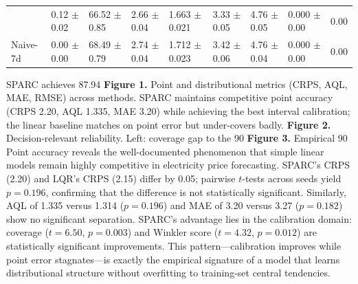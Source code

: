 {\begin{table}[t]
{\begin{tabular}{lllllllll}
{Naive-24h & 0.12 $\pm$ 0.02 & 66.52 $\pm$ 0.85 & 2.66 $\pm$ 0.04 & 1.663 $\pm$ 0.021 & 3.33 $\pm$ 0.05 & 4.76 $\pm$ 0.05 & 0.000 $\pm$ 0.00 & 0.00 \\
Naive-7d & 0.00 $\pm$ 0.00 & 68.49 $\pm$ 0.79 & 2.74 $\pm$ 0.04 & 1.712 $\pm$ 0.023 & 3.42 $\pm$ 0.06 & 4.76 $\pm$ 0.04 & 0.000 $\pm$ 0.00 & 0.00 \\
\bottomrule
\end{tabular}
}
\end{table}
SPARC achieves 87.94%
\textbf{Figure 1.} Point and distributional metrics (CRPS, AQL, MAE, RMSE) across methods. SPARC maintains competitive point accuracy (CRPS 2.20, AQL 1.335, MAE 3.20) while achieving the best interval calibration; the linear baseline matches on point error but under-covers badly.
\textbf{Figure 2.} Decision-relevant reliability. Left: coverage gap to the 90%
\textbf{Figure 3.} Empirical 90%
Point accuracy reveals the well-documented phenomenon that simple linear models remain highly competitive in electricity price forecasting. SPARC's CRPS (2.20) and LQR's CRPS (2.15) differ by 0.05; pairwise $t$-tests across seeds yield $p = 0.196$, confirming that the difference is not statistically significant. Similarly, AQL of 1.335 versus 1.314 ($p = 0.196$) and MAE of 3.20 versus 3.27 ($p = 0.182$) show no significant separation. SPARC's advantage lies in the calibration domain: coverage ($t = 6.50$, $p = 0.003$) and Winkler score ($t = 4.32$, $p = 0.012$) are statistically significant improvements. This pattern---calibration improves while point error stagnates---is exactly the empirical signature of a model that learns distributional structure without overfitting to training-set central tendencies.
}
